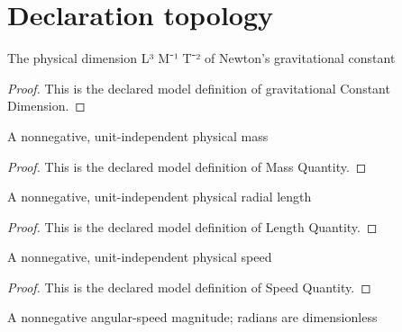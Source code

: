 \section{Declaration topology}
\begin{definition}
  \label{def:physics:phyx-mini-0714:phyxminiproblems-problemphyxmini0714-gravitationalconstantdimension}
  The physical dimension L³ M⁻¹ T⁻² of Newton's gravitational constant
\end{definition}
\begin{proof}
  This is the declared model definition of gravitational Constant Dimension.
\end{proof}
\begin{definition}
  \label{def:physics:phyx-mini-0714:phyxminiproblems-problemphyxmini0714-massquantity}
  A nonnegative, unit-independent physical mass
\end{definition}
\begin{proof}
  This is the declared model definition of Mass Quantity.
\end{proof}
\begin{definition}
  \label{def:physics:phyx-mini-0714:phyxminiproblems-problemphyxmini0714-lengthquantity}
  A nonnegative, unit-independent physical radial length
\end{definition}
\begin{proof}
  This is the declared model definition of Length Quantity.
\end{proof}
\begin{definition}
  \label{def:physics:phyx-mini-0714:phyxminiproblems-problemphyxmini0714-speedquantity}
  A nonnegative, unit-independent physical speed
\end{definition}
\begin{proof}
  This is the declared model definition of Speed Quantity.
\end{proof}
\begin{definition}
  \label{def:physics:phyx-mini-0714:phyxminiproblems-problemphyxmini0714-angularspeedmagnitudequantity}
  A nonnegative angular-speed magnitude; radians are dimensionless
\end{definition}
